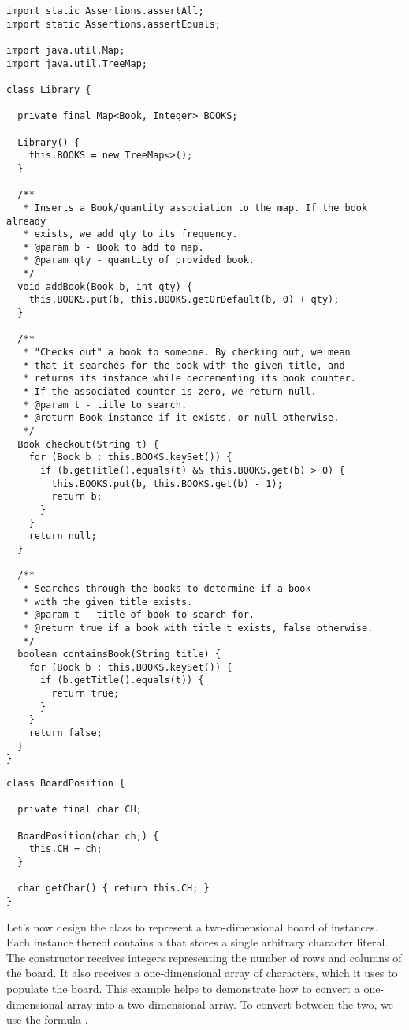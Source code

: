 \begin{lstlisting}[language=MyJava]
import static Assertions.assertAll;
import static Assertions.assertEquals;

import java.util.Map;
import java.util.TreeMap;

class Library {

  private final Map<Book, Integer> BOOKS;

  Library() {
    this.BOOKS = new TreeMap<>();
  }

  /**
   * Inserts a Book/quantity association to the map. If the book already
   * exists, we add qty to its frequency.
   * @param b - Book to add to map.
   * @param qty - quantity of provided book.
   */
  void addBook(Book b, int qty) {
    this.BOOKS.put(b, this.BOOKS.getOrDefault(b, 0) + qty);
  }

  /**
   * "Checks out" a book to someone. By checking out, we mean
   * that it searches for the book with the given title, and
   * returns its instance while decrementing its book counter.
   * If the associated counter is zero, we return null.
   * @param t - title to search.
   * @return Book instance if it exists, or null otherwise.
   */
  Book checkout(String t) {
    for (Book b : this.BOOKS.keySet()) {
      if (b.getTitle().equals(t) && this.BOOKS.get(b) > 0) {
        this.BOOKS.put(b, this.BOOKS.get(b) - 1);
        return b;
      }
    }
    return null;
  }

  /** 
   * Searches through the books to determine if a book
   * with the given title exists.
   * @param t - title of book to search for.
   * @return true if a book with title t exists, false otherwise.
   */
  boolean containsBook(String title) {
    for (Book b : this.BOOKS.keySet()) {
      if (b.getTitle().equals(t)) {
        return true;
      }
    }
    return false;
  }
}
\end{lstlisting}


\begin{lstlisting}[language=MyJava]
class BoardPosition {

  private final char CH;

  BoardPosition(char ch;) {
    this.CH = ch;
  }

  char getChar() { return this.CH; }
}
\end{lstlisting}

Let's now design the  class to represent a two-dimensional board of  instances.
Each instance thereof contains a  that stores a single arbitrary character literal.
The  constructor receives integers representing the number of rows and columns of the board.
It also receives a one-dimensional array of characters, which it uses to populate the board.
This example helps to demonstrate how to convert a one-dimensional array into a two-dimensional array.
To convert between the two, we use the formula .

